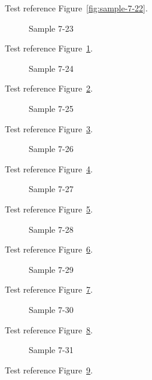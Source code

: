 Test reference Figure~\ref{fig:sample-7-22}.

\begin{figure}[tbhp]
\caption{Sample 7-23}
\label{fig:sample-7-23}
\end{figure}

Test reference Figure~\ref{fig:sample-7-23}.

\begin{figure}[tbhp]
\caption{Sample 7-24}
\label{fig:sample-7-24}
\end{figure}

Test reference Figure~\ref{fig:sample-7-24}.

\begin{figure}[tbhp]
\caption{Sample 7-25}
\label{fig:sample-7-25}
\end{figure}

Test reference Figure~\ref{fig:sample-7-25}.

\begin{figure}[tbhp]
\caption{Sample 7-26}
\label{fig:sample-7-26}
\end{figure}

Test reference Figure~\ref{fig:sample-7-26}.

\begin{figure}[tbhp]
\caption{Sample 7-27}
\label{fig:sample-7-27}
\end{figure}

Test reference Figure~\ref{fig:sample-7-27}.

\begin{figure}[tbhp]
\caption{Sample 7-28}
\label{fig:sample-7-28}
\end{figure}

Test reference Figure~\ref{fig:sample-7-28}.

\begin{figure}[tbhp]
\caption{Sample 7-29}
\label{fig:sample-7-29}
\end{figure}

Test reference Figure~\ref{fig:sample-7-29}.

\begin{figure}[tbhp]
\caption{Sample 7-30}
\label{fig:sample-7-30}
\end{figure}

Test reference Figure~\ref{fig:sample-7-30}.

\begin{figure}[tbhp]
\caption{Sample 7-31}
\label{fig:sample-7-31}
\end{figure}

Test reference Figure~\ref{fig:sample-7-31}.

